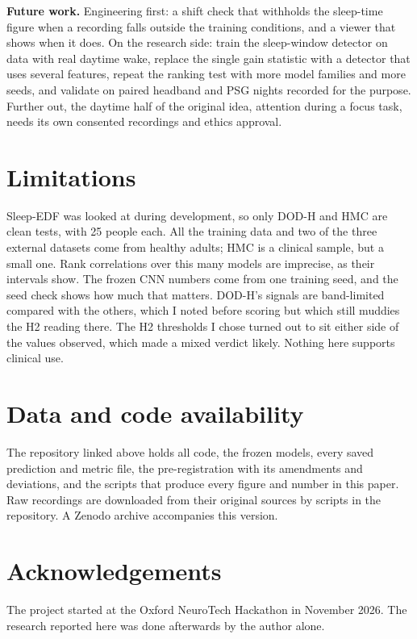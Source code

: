 \documentclass[10pt,twocolumn]{article}
\begin{document}
\textbf{Future work.} Engineering first: a shift check that withholds the sleep-time figure when a
recording falls outside the training conditions, and a viewer that shows when it does. On the research
side: train the sleep-window detector on data with real daytime wake, replace the single gain statistic
with a detector that uses several features, repeat the ranking test with more model families and more
seeds, and validate on paired headband and PSG nights recorded for the purpose. Further out, the daytime
half of the original idea, attention during a focus task, needs its own consented recordings and ethics
approval.

\section{Limitations}

Sleep-EDF was looked at during development, so only DOD-H and HMC are clean tests, with 25 people each.
All the training data and two of the three external datasets come from healthy adults; HMC is a
clinical sample, but a small one. Rank correlations over this many models are imprecise, as their
intervals show. The frozen CNN numbers come from one training seed, and the seed check shows how much
that matters. DOD-H's signals are band-limited compared with the others, which I noted before scoring
but which still muddies the H2 reading there. The H2 thresholds I chose turned out to sit either side of
the values observed, which made a mixed verdict likely. Nothing here supports clinical use.

\section*{Data and code availability}
The repository linked above holds all code, the frozen models, every saved prediction and metric file,
the pre-registration with its amendments and deviations, and the scripts that produce every figure and
number in this paper. Raw recordings are downloaded from their original sources by scripts in the
repository. A Zenodo archive accompanies this version.

\section*{Acknowledgements}
The project started at the Oxford NeuroTech Hackathon in November 2026. The research reported here was
done afterwards by the author alone.

\small


\end{document}
